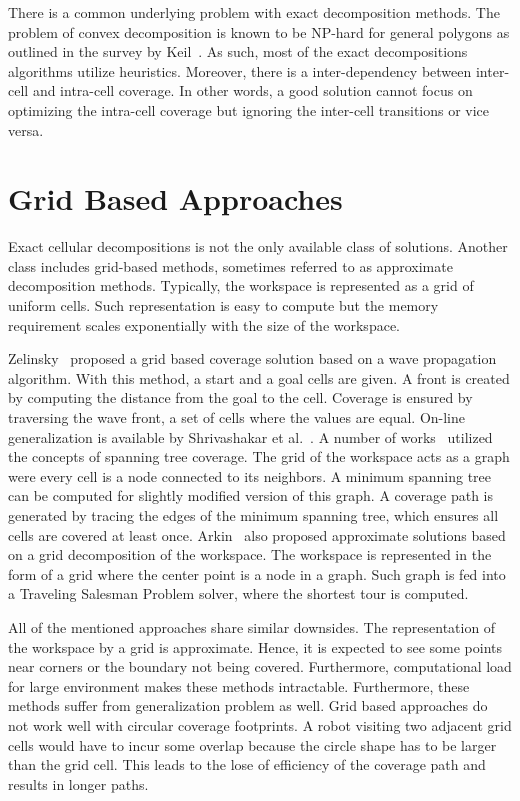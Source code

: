 \documentclass[../main.tex]{subfiles}
\begin{document}
There is a common underlying problem with exact decomposition methods. The problem of convex decomposition is known to be NP-hard for general polygons as outlined in the survey by Keil~\cite{keil2000polygon}. As such, most of the exact decompositions algorithms utilize heuristics. Moreover, there is a inter-dependency between inter-cell and intra-cell coverage. In other words, a good solution cannot focus on optimizing the intra-cell coverage but ignoring the inter-cell transitions or vice versa.


\section{Grid Based Approaches}
\label{section:grid_based_approaches}

Exact cellular decompositions is not the only available class of solutions. Another class includes grid-based methods, sometimes referred to as approximate decomposition methods. Typically, the workspace is represented as a grid of uniform cells. Such representation is easy to compute but the memory requirement scales exponentially with the size of the workspace.

Zelinsky~\cite{Zelinsky1993planning} proposed a grid based coverage solution based on a wave propagation algorithm. With this method, a start and a goal cells are given. A front is created by computing the distance from the goal to the cell. Coverage is ensured by traversing the wave front, a set of cells where the values are equal. On-line generalization is available by Shrivashakar et al.~\cite{shivashankar2011real}. A number of works~\cite{Gabriely2001spanning,gonzalez2003bsa,gonzalez2005bsa,choi2009online,Lee2011smooth} utilized the concepts of spanning tree coverage. The grid of the workspace acts as a graph were every cell is a node connected to its neighbors. A minimum spanning tree can be computed for slightly modified version of this graph. A coverage path is generated by tracing the edges of the minimum spanning tree, which ensures all cells are covered at least once. Arkin~\cite{arkin2000approximation} also proposed approximate solutions based on a grid decomposition of the workspace. The workspace is represented in the form of a grid where the center point is a node in a graph. Such graph is fed into a Traveling Salesman Problem solver, where the shortest tour is computed.

All of the mentioned approaches share similar downsides. The representation of the workspace by a grid is approximate. Hence, it is expected to see some points near corners or the boundary not being covered. Furthermore, computational load for large environment makes these methods intractable. Furthermore, these methods suffer from generalization problem as well. Grid based approaches do not work well with circular coverage footprints. A robot visiting two adjacent grid cells would have to incur some overlap because the circle shape has to be larger than the grid cell. This leads to the lose of efficiency of the coverage path and results in longer paths.
\end{document}
